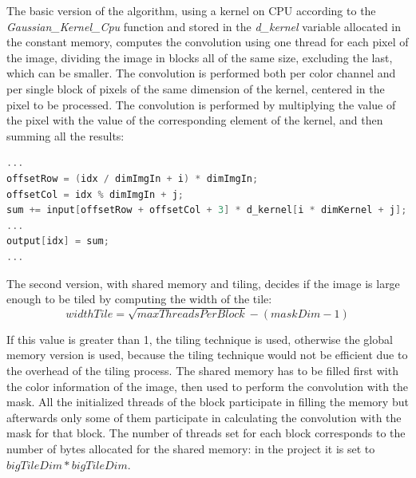     The basic version of the algorithm, using a kernel on CPU according to the \textit{Gaussian\_Kernel\_Cpu} function and stored in the \textit{d\_kernel} variable
    allocated in the constant memory, computes the convolution using one thread for each pixel of the image, dividing the image in blocks all of the same size, excluding the last, 
    which can be smaller. The convolution is performed both per color channel and per single block of pixels of the same dimension of the kernel, centered in the pixel to be processed.
    The convolution is performed by multiplying the value of the pixel with the value of the corresponding element of the kernel, and then summing all the results:
    \noindent\begin{lstlisting}[language=C]
...
offsetRow = (idx / dimImgIn + i) * dimImgIn;
offsetCol = idx % dimImgIn + j;
sum += input[offsetRow + offsetCol + 3] * d_kernel[i * dimKernel + j];
...
output[idx] = sum;
...
    \end{lstlisting}

    The second version, with shared memory and tiling, decides if the image is large enough to be tiled by computing the width of the tile:
    \begin{equation}
        widthTile = \sqrt{maxThreadsPerBlock} - (maskDim - 1)
    \end{equation}
    
    \noindent If this value is greater than 1, the tiling technique is used, otherwise the global memory version is used, because the tiling technique would not be efficient
    due to the overhead of the tiling process.
    The shared memory has to be filled first with the color information of the image, then used to perform the convolution with the mask.
    All the initialized threads of the block participate in filling the memory but afterwards only some of them participate in calculating the convolution with the mask for that block.
    The number of threads set for each block corresponds to the number of bytes allocated for the shared memory: in the project it is set to $bigTileDim*bigTileDim$.

